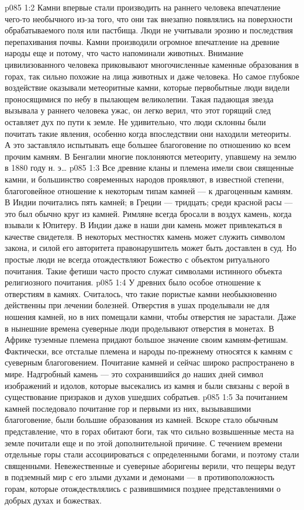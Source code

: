 \vs p085 1:2 Камни впервые стали производить на раннего человека впечатление чего\hyp{}то необычного из\hyp{}за того, что они так внезапно появлялись на поверхности обрабатываемого поля или пастбища. Люди не учитывали эрозию и последствия перепахивания почвы. Камни производили огромное впечатление на древние народы еще и потому, что часто напоминали животных. Внимание цивилизованного человека приковывают многочисленные каменные образования в горах, так сильно похожие на лица животных и даже человека. Но самое глубокое воздействие оказывали метеоритные камни, которые первобытные люди видели проносящимися по небу в пылающем великолепии. Такая падающая звезда вызывала у раннего человека ужас, он легко верил, что этот горящий след оставляет дух по пути к земле. Не удивительно, что люди склонны были почитать такие явления, особенно когда впоследствии они находили метеориты. А это заставляло испытывать еще большее благоговение по отношению ко всем прочим камням. В Бенгалии многие поклоняются метеориту, упавшему на землю в 1880 году н. э\ldots
\vs p085 1:3 Все древние кланы и племена имели свои священные камни, и большинство современных народов проявляют, в известной степени, благоговейное отношение к некоторым типам камней --- к драгоценным камням. В Индии почитались пять камней; в Греции --- тридцать; среди красной расы --- это был обычно круг из камней. Римляне всегда бросали в воздух камень, когда взывали к Юпитеру. В Индии даже в наши дни камень может привлекаться в качестве свидетеля. В некоторых местностях камень может служить символом закона, и силой его авторитета правонарушитель может быть доставлен в суд. Но простые люди не всегда отождествляют Божество с объектом ритуального почитания. Такие фетиши часто просто служат символами истинного объекта религиозного почитания.
\vs p085 1:4 У древних было особое отношение к отверстиям в камнях. Считалось, что такие пористые камни необыкновенно действенны при лечении болезней. Отверстия в ушах проделывали не для ношения камней, но в них помещали камни, чтобы отверстия не зарастали. Даже в нынешние времена суеверные люди проделывают отверстия в монетах. В Африке туземные племена придают большое значение своим камням\hyp{}фетишам. Фактически, все отсталые племена и народы по\hyp{}прежнему относятся к камням с суеверным благоговением. Почитание камней и сейчас широко распространено в мире. Надгробный камень --- это сохранившийся до наших дней символ изображений и идолов, которые высекались из камня и были связаны с верой в существование призраков и духов ушедших собратьев.
\vs p085 1:5 За почитанием камней последовало почитание гор и первыми из них, вызывавшими благоговение, были большие образования из камней. Вскоре стало обычным представление, что в горах обитают боги, так что сильно возвышенные места на земле почитали еще и по этой дополнительной причине. С течением времени отдельные горы стали ассоциироваться с определенными богами, и поэтому стали священными. Невежественные и суеверные аборигены верили, что пещеры ведут в подземный мир с его злыми духами и демонами --- в противоположность горам, которые отождествлялись с развившимися позднее представлениями о добрых духах и божествах.
